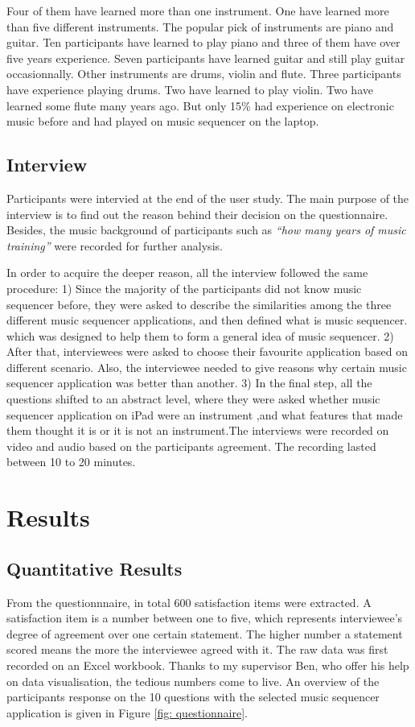 Four of them have learned more than one instrument. One have learned more than five different instruments. The popular pick of instruments are piano and guitar. Ten participants have learned to play piano and three of them have over five years experience. Seven participants have learned guitar and still play guitar occasionnally. Other instruments are drums, violin and flute. Three participants have experience playing drums. Two have learned to play violin. Two have learned some flute many years ago. But only 15\% had experience on electronic music before and had played on music sequencer on the laptop.

\subsection{Interview}

Participants were intervied at the end of the user study. The main purpose of the interview is to find out the reason behind their decision on the questionnaire. Besides, the music background of participants such as \textit{\textquotedblleft{how many years of music training}\textquotedblright} were recorded for further analysis.

In order to acquire the deeper reason, all the interview followed the same procedure: 1) Since the majority of the participants did not know music sequencer before, they were asked to describe the similarities among the three different music sequencer applications, and then defined what is music sequencer. which was designed to help them to form a general idea of music sequencer. 2) After that, interviewees were asked to choose their favourite application based on different scenario. Also, the interviewee needed to give reasons why certain music sequencer application was better than another. 3) In the final step, all the questions shifted to an abstract level, where they were asked whether music sequencer application on iPad were an instrument ,and what features that made them thought it is or it is not an instrument.The interviews were recorded on video and audio based on the participants agreement. The recording lasted between 10 to 20 minutes.

\section{Results}

\subsection{Quantitative Results}
From the questionnnaire, in total 600 satisfaction items were extracted. A satisfaction item is a number between one to five, which represents interviewee's degree of agreement over one certain statement. The higher number a statement scored means the more the interviewee agreed with it. The raw data was first recorded on an Excel workbook. Thanks to my supervisor Ben, who offer his help on data visualisation, the tedious numbers come to live. An overview of the participants response on the 10 questions with the selected music sequencer application is given in Figure \ref{fig: questionnaire}.

